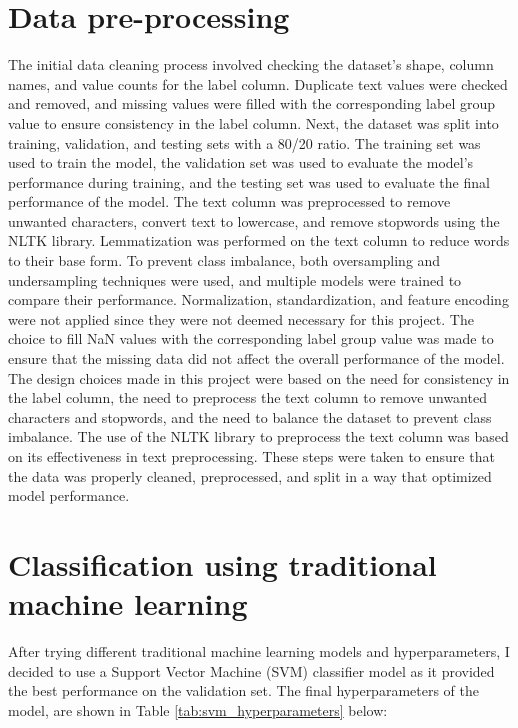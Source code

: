 \documentclass[12pt, a4paper]{article}
\begin{document}
\section{Data pre-processing}
The initial data cleaning process involved checking the dataset's shape, column names, and value counts for the label column. Duplicate text values were checked and removed, and missing values were filled with the corresponding label group value to ensure consistency in the label column.
\newline
Next, the dataset was split into training, validation, and testing sets with a 80/20 ratio. The training set was used to train the model, the validation set was used to evaluate the model's performance during training, and the testing set was used to evaluate the final performance of the model.
The text column was preprocessed to remove unwanted characters, convert text to lowercase, and remove stopwords using the NLTK library. Lemmatization was performed on the text column to reduce words to their base form.
\newline
To prevent class imbalance, both oversampling and undersampling techniques were used, and multiple models were trained to compare their performance. Normalization, standardization, and feature encoding were not applied since they were not deemed necessary for this project. The choice to fill NaN values with the corresponding label group value was made to ensure that the missing data did not affect the overall performance of the model.
\newline
The design choices made in this project were based on the need for consistency in the label column, the need to preprocess the text column to remove unwanted characters and stopwords, and the need to balance the dataset to prevent class imbalance. The use of the NLTK library to preprocess the text column was based on its effectiveness in text preprocessing.
These steps were taken to ensure that the data was properly cleaned, preprocessed, and split in a way that optimized model performance.

\section{Classification using traditional machine learning}
After trying different traditional machine learning models and hyperparameters, I decided to use a Support Vector Machine (SVM) classifier model as it provided the best performance on the validation set. The final hyperparameters of the model, are shown in Table \ref{tab:svm_hyperparameters} below:
\newline
\end{document}
